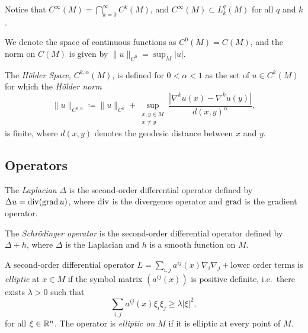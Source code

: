 \begin{note}
  Notice that $C^\infty(M) = \bigcap_{k=0}^\infty C^k(M)$, and $C^\infty(M) \subset L^q_k(M)$ for all $q$ and $k$.
\end{note}

\begin{note}
  We denote the space of continuous functions as $C^0(M) = C(M)$, and the norm on $C(M)$ is given by $\|u\|_{C^0} = \sup_M |u|$.
\end{note}

\begin{definition}
  The \emph{H\"older Space}, $C^{k,\alpha}(M)$, is defined for $0 < \alpha < 1$ as the set of $u \in C^k(M)$ for which the \emph{H\"older norm}
  \begin{equation}\label{eq:holder_norm}
    \|u\|_{C^{k,\alpha}} \coloneqq \|u\|_{C^k} + \sup_{\substack{x,y \in M \\ x \neq y}} \frac{\left\lvert \nabla^k u(x) - \nabla^k u(y)\right\rvert}{d(x, y)^\alpha}
  ,\end{equation}
  is finite, where $d(x, y)$ denotes the geodesic distance between $x$ and $y$.
\end{definition}

\subsection{Operators}

\begin{definition}[Laplacian]
  The \emph{Laplacian} $\Delta$ is the second-order differential operator defined by $\Delta u = \operatorname{div}(\operatorname{grad} u)$, where $\operatorname{div}$ is the divergence operator and $\operatorname{grad}$ is the gradient operator.
\end{definition}

\begin{definition}
  The \emph{Schr\"odinger operator} is the second-order differential operator defined by $\Delta + h$, where $\Delta$ is the Laplacian and $h$ is a smooth function on $M$.
\end{definition}

\begin{definition}
  A second-order differential operator $L = \sum_{i,j} a^{ij}(x) \nabla_i \nabla_j + \text{lower order terms}$ is \emph{elliptic} at $x \in M$ if the symbol matrix $(a^{ij}(x))$ is positive definite, i.e.\ there exists $\lambda > 0$ such that
  \[%
    \sum_{i,j} a^{ij}(x) \xi_i \xi_j \ge \lambda |\xi|^2
  ,\]%
  for all $\xi \in \mathbb{R}^n$. The operator is \emph{elliptic on $M$} if it is elliptic at every point of $M$.
\end{definition}

